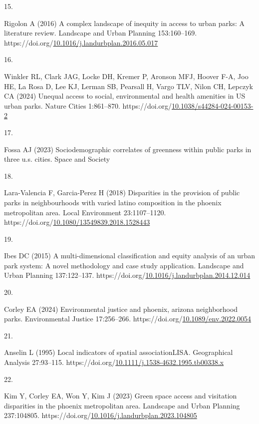\documentclass[
  sn-basic,
]{sn-jnl}
\newlength{\cslhangindent}
\newlength{\csllabelwidth}
\newenvironment{CSLReferences}[2] %
 {\begin{list}{}{%
  \setlength{\itemindent}{0pt}
  \setlength{\leftmargin}{0pt}
  \setlength{\parsep}{0pt}
  \ifodd #1
   \setlength{\leftmargin}{\cslhangindent}
   \setlength{\itemindent}{-1\cslhangindent}
  \fi
  \setlength{\itemsep}{#2\baselineskip}}}
 {\end{list}}
\newcommand{\CSLLeftMargin}[1]{\parbox[t]{\csllabelwidth}{\strut#1\strut}}
\newcommand{\CSLRightInline}[1]{\parbox[t]{\linewidth - \csllabelwidth}{\strut#1\strut}}
\begin{document}
\begin{CSLReferences}{0}{1}
\CSLLeftMargin{15. }%
\CSLRightInline{Rigolon A (2016) A complex landscape of inequity in
access to urban parks: A literature review. Landscape and Urban Planning
153:160--169.
https://doi.org/\href{https://doi.org/10.1016/j.landurbplan.2016.05.017}{10.1016/j.landurbplan.2016.05.017}}

\CSLLeftMargin{16. }%
\CSLRightInline{Winkler RL, Clark JAG, Locke DH, Kremer P, Aronson MFJ,
Hoover F-A, Joo HE, La Rosa D, Lee KJ, Lerman SB, Pearsall H, Vargo TLV,
Nilon CH, Lepczyk CA (2024) Unequal access to social, environmental and
health amenities in US urban parks. Nature Cities 1:861--870.
https://doi.org/\href{https://doi.org/10.1038/s44284-024-00153-2}{10.1038/s44284-024-00153-2}}

\CSLLeftMargin{17. }%
\CSLRightInline{Fossa AJ (2023) Sociodemographic correlates of greenness
within public parks in three u.s. cities. Space and Society}

\CSLLeftMargin{18. }%
\CSLRightInline{Lara-Valencia F, Garcia-Perez H (2018) Disparities in
the provision of public parks in neighbourhoods with varied latino
composition in the phoenix metropolitan area. Local Environment
23:1107--1120.
https://doi.org/\href{https://doi.org/10.1080/13549839.2018.1528443}{10.1080/13549839.2018.1528443}}

\CSLLeftMargin{19. }%
\CSLRightInline{Ibes DC (2015) A multi-dimensional classification and
equity analysis of an urban park system: A novel methodology and case
study application. Landscape and Urban Planning 137:122--137.
https://doi.org/\href{https://doi.org/10.1016/j.landurbplan.2014.12.014}{10.1016/j.landurbplan.2014.12.014}}

\CSLLeftMargin{20. }%
\CSLRightInline{Corley EA (2024) Environmental justice and phoenix,
arizona neighborhood parks. Environmental Justice 17:256--266.
https://doi.org/\href{https://doi.org/10.1089/env.2022.0054}{10.1089/env.2022.0054}}

\CSLLeftMargin{21. }%
\CSLRightInline{Anselin L (1995) Local indicators of spatial
association{\textemdash}LISA. Geographical Analysis 27:93--115.
https://doi.org/\href{https://doi.org/10.1111/j.1538-4632.1995.tb00338.x}{10.1111/j.1538-4632.1995.tb00338.x}}

\CSLLeftMargin{22. }%
\CSLRightInline{Kim Y, Corley EA, Won Y, Kim J (2023) Green space access
and visitation disparities in the phoenix metropolitan area. Landscape
and Urban Planning 237:104805.
https://doi.org/\href{https://doi.org/10.1016/j.landurbplan.2023.104805}{10.1016/j.landurbplan.2023.104805}}


\end{CSLReferences}
\end{document}
